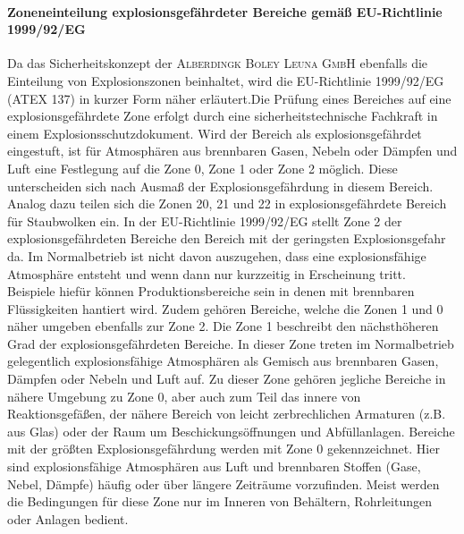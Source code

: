 \paragraph{Zoneneinteilung explosionsgefährdeter Bereiche gemäß EU-Richtlinie 1999/92/EG}
Da das Sicherheitskonzept der \textsc{Alberdingk Boley Leuna GmbH} ebenfalls die Einteilung von Explosionszonen beinhaltet, wird die EU-Richtlinie 1999/92/EG (ATEX 137) in kurzer Form näher erläutert.Die Prüfung eines Bereiches auf eine explosionsgefährdete Zone erfolgt durch eine sicherheitstechnische Fachkraft in einem Explosionsschutzdokument. Wird der Bereich als explosionsgefährdet eingestuft, ist für Atmosphären aus brennbaren Gasen, Nebeln oder Dämpfen und Luft eine Festlegung auf die Zone 0, Zone 1 oder Zone 2 möglich. Diese unterscheiden sich nach Ausmaß der Explosionsgefährdung in diesem Bereich. Analog dazu teilen sich die Zonen 20, 21 und 22 in explosionsgefährdete Bereich für Staubwolken ein.\linebreak
In der EU-Richtlinie 1999/92/EG stellt Zone 2 der explosionsgefährdeten Bereiche den Bereich mit der geringsten Explosionsgefahr da. Im Normalbetrieb ist nicht davon auszugehen, dass eine explosionsfähige Atmosphäre entsteht und wenn dann nur kurzzeitig in Erscheinung tritt. Beispiele hiefür können Produktionsbereiche sein in denen mit brennbaren Flüssigkeiten hantiert wird. Zudem gehören Bereiche, welche die Zonen 1 und 0 näher umgeben ebenfalls zur Zone 2.\linebreak
Die Zone 1 beschreibt den nächsthöheren Grad der explosionsgefährdeten Bereiche. In dieser Zone treten im Normalbetrieb gelegentlich explosionsfähige Atmosphären als Gemisch aus brennbaren Gasen, Dämpfen oder Nebeln und Luft auf. Zu dieser Zone gehören jegliche Bereiche in nähere Umgebung zu Zone 0, aber auch zum Teil das innere von Reaktionsgefäßen, der nähere Bereich von leicht zerbrechlichen Armaturen (z.B. aus Glas) oder der Raum um Beschickungsöffnungen und Abfüllanlagen.\linebreak
Bereiche mit der größten Explosionsgefährdung werden mit Zone 0 gekennzeichnet. Hier sind explosionsfähige Atmosphären aus Luft und brennbaren Stoffen (Gase, Nebel, Dämpfe) häufig oder über längere Zeiträume vorzufinden. Meist werden die Bedingungen für diese Zone nur im Inneren von Behältern, Rohrleitungen oder Anlagen bedient.\,\cite{Ignatowitz.2015,bgn.2018}

